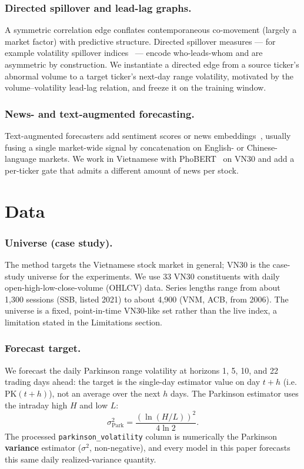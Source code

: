 \documentclass[runningheads]{llncs}
\begin{document}
\subsubsection{Directed spillover and lead-lag graphs.}
A symmetric correlation edge conflates contemporaneous co-movement (largely a market factor) with
predictive structure. Directed spillover measures --- for example volatility spillover
indices~\cite{diebold2012} --- encode who-leads-whom and are asymmetric by construction. We instantiate a
directed edge from a source ticker's abnormal volume to a target ticker's next-day range volatility,
motivated by the volume--volatility lead-lag relation, and freeze it on the training window.

\subsubsection{News- and text-augmented forecasting.}
Text-augmented forecasters add sentiment scores or news embeddings~\cite{ouyang2021,das2024}, usually
fusing a single market-wide signal by concatenation on English- or Chinese-language markets. We work in
Vietnamese with PhoBERT~\cite{phobert2020} on VN30 and add a per-ticker gate that admits a different amount
of news per stock.

\section{Data}
\label{sec:data}
\subsubsection{Universe (case study).}
The method targets the Vietnamese stock market in general; VN30 is the case-study universe for the
experiments. We use 33 VN30 constituents with daily open-high-low-close-volume (OHLCV) data. Series lengths
range from about 1{,}300 sessions (SSB, listed 2021) to about 4{,}900 (VNM, ACB, from 2006). The universe
is a fixed, point-in-time VN30-like set rather than the live index, a limitation stated in the Limitations
section.

\subsubsection{Forecast target.}
We forecast the daily Parkinson range volatility at horizons 1, 5, 10, and 22 trading days ahead: the
target is the single-day estimator value on day $t{+}h$ (i.e.\ $\text{PK}(t{+}h)$), not an average over
the next $h$ days. The Parkinson estimator uses the intraday high $H$ and low $L$:
\begin{equation}
\sigma^2_{\text{Park}} = \frac{(\ln(H/L))^2}{4\ln 2}.
\label{eq:parkinson}
\end{equation}
The processed \texttt{parkinson\_volatility} column is numerically the Parkinson \textbf{variance}
estimator ($\sigma^2$, non-negative), and every model in this paper forecasts this same daily
realized-variance quantity.
\end{document}
